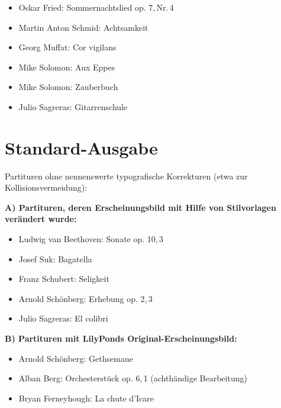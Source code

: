 \documentclass[DIV=12]{scrreprt}
\begin{document}
\begin{itemize}
\item Oskar Fried: Sommernachtslied op. 7,\,Nr.\,4
\item Martin Anton Schmid: Achtsamkeit
\item Georg Muffat: Cor vigilans
\item Mike Solomon: Aux Eppes
\item Mike Solomon: Zauberbuch
\item Julio Sagreras: Gitarrenschule
\end{itemize}








\section*{Standard-Ausgabe}
Partituren ohne nennenswerte typografische Korrekturen (etwa zur Kollisionsvermeidung):

\bigskip

\textbf{A) Partituren, deren Erscheinungsbild mit Hilfe von Stilvorlagen verändert wurde:}

\begin{itemize}
\item Ludwig van Beethoven: Sonate op. 10,\,3
\item Josef Suk: Bagatella 
\item Franz Schubert: Seligkeit
\item Arnold Schönberg: Erhebung op. 2,\,3
\item Julio Sagreras: El colibri
\end{itemize}

\textbf{B) Partituren mit LilyPonds Original-Erscheinungsbild:}

\begin{itemize}
\item Arnold Schönberg: Gethsemane
\item Alban Berg: Orchesterstück op. 6,\,1 (achthändige Bearbeitung)
\item Bryan Ferneyhough: La chute d'Icare
\end{itemize}









\end{document}
